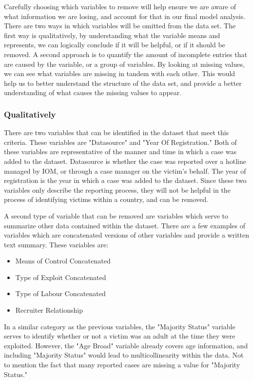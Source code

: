 \documentclass{article} %
\begin{document}
	Carefully choosing which variables to remove will help ensure we are aware of what information we are losing, and account for that in our final model analysis. There are two ways in which variables will be omitted from the data set. The first way is qualitatively, by understanding what the variable means and represents, we can logically conclude if it will be helpful, or if it should be removed. A second approach is to quantify the amount of incomplete entries that are caused by the variable, or a group of variables. By looking at missing values, we can see what variables are missing in tandem with each other. This would help us to better understand the structure of the data set, and provide a better understanding of what causes the missing values to appear.
	
	
	
	\subsubsection{Qualitatively}
	 
	
	There are two variables that can be identified in the dataset that meet this criteria. These variables are "Datasource" and "Year Of Registration." Both of these variables are representative of the manner and time in which a case was added to the dataset. Datasource is whether the case was reported over a hotline managed by IOM, or through a case manager on the victim's behalf. The year of registration is the year in which a case was added to the dataset. Since these two variables only describe the reporting process, they will not be helpful in the process of identifying victims within a country, and can be removed.
	
	A second type of variable that can be removed are variables which serve to summarize other data contained within the dataset. There are a few examples of variables which are concatenated versions of other variables and provide a written text summary. These variables are:
	
	\begin{itemize}
		\item Means of Control Concatenated
		\item Type of Exploit Concatenated
		\item Type of Labour Concatenated
		\item Recruiter Relationship
	\end{itemize}
	
	In a similar category as the previous variables, the "Majority Status" variable serves to identify whether or not a victim was an adult at the time they were exploited. However, the "Age Broad" variable already covers age information, and including "Majority Status" would lead to multicollinearity within the data. Not to mention the fact that many reported cases are missing a value for "Majority Status."
	
	
	
	\printbibliography
	
	
\end{document}
